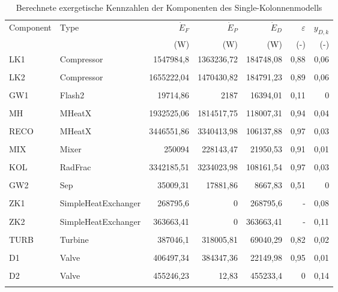 \begin{longtable}{llrrrrr}
\caption{Berechnete exergetische Kennzahlen der Komponenten des Single-Kolonnenmodells} \\
\hline
Component & Type & $\dot{E}_F$ & $\dot{E}_P$ & $\dot{E}_D$ & $\varepsilon$ & $y_{D,k}$ \\
 &  & (W) & (W) & (W) & (-) & (-) \\
\hline
LK1 & Compressor & 1547984,8 & 1363236,72 & 184748,08 & 0,88 & 0,06 \\\\
LK2 & Compressor & 1655222,04 & 1470430,82 & 184791,23 & 0,89 & 0,06 \\\\
GW1 & Flash2 & 19714,86 & 2187 & 16394,01 & 0,11 & 0 \\\\
MH & MHeatX & 1932525,06 & 1814517,75 & 118007,31 & 0,94 & 0,04 \\\\
RECO & MHeatX & 3446551,86 & 3340413,98 & 106137,88 & 0,97 & 0,03 \\\\
MIX & Mixer & 250094 & 228143,47 & 21950,53 & 0,91 & 0,01 \\\\
KOL & RadFrac & 3342185,51 & 3234023,98 & 108161,54 & 0,97 & 0,03 \\\\
GW2 & Sep & 35009,31 & 17881,86 & 8667,83 & 0,51 & 0 \\\\
ZK1 & SimpleHeatExchanger & 268795,6 & 0 & 268795,6 & - & 0,08 \\\\
ZK2 & SimpleHeatExchanger & 363663,41 & 0 & 363663,41 & - & 0,11 \\\\
TURB & Turbine & 387046,1 & 318005,81 & 69040,29 & 0,82 & 0,02 \\\\
D1 & Valve & 406497,34 & 384347,36 & 22149,98 & 0,95 & 0,01 \\\\
D2 & Valve & 455246,23 & 12,83 & 455233,4 & 0 & 0,14 \\\\
\hline
\end{longtable}